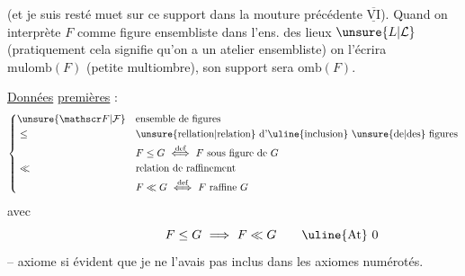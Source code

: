 (et je suis resté muet sur ce support dans la mouture précédente  $\underline{\overline{\mathrm{VI}}}$). Quand on interprète $F$ comme figure ensembliste dans l'ens. des lieux $\unsure{L|\mathcal L}$  (pratiquement cela signifie qu'on a un atelier ensembliste) on l'écrira $\mathrm{mulomb}(F)$ (petite multiombre), son support sera $\mathrm{omb}(F)$.

\uline{Données} \uline{ premières} :
\[
\left\{\begin{aligned}
&\unsure{\mathscr F|\mathcal F} &&\text{ensemble de figures}\\
&\leq &&\text{\unsure{rellation|relation} d'\uline{inclusion} \unsure{de|des} figures}\\
& &&F\leq G\ \overset{\text{def}}{\Longleftrightarrow}\ F\ \text{sous figure de }G\\
&\ll &&\text{relation de raffinement}\\
& && F\ll G\ \overset{\text{def}}{\Longleftrightarrow}\ F\ \text{raffine }G
\end{aligned}\right.
\]
avec
\[
F\leq G\ \Longrightarrow\ F\ll G\tag*{\makebox[0pt][r]{\makebox[\displaywidth][l]{\uline{At} 0}}}
\]
-- axiome si évident que je ne l'avais pas inclus dans les axiomes numérotés.

